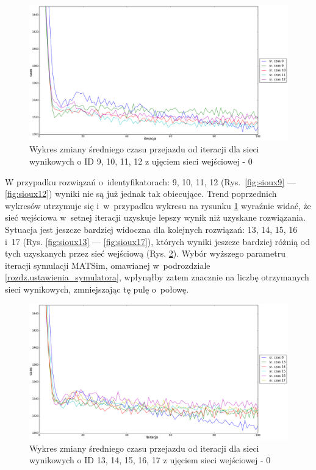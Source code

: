 \documentclass[twoside,12pt]{report}
\begin{document}
\begin{figure}[htbp]
\centering
\includegraphics[width=1\textwidth]{img/iters/iters3}
\caption{Wykres zmiany średniego czasu przejazdu od iteracji dla sieci wynikowych  o ID 9, 10, 11, 12 z ujęciem sieci wejściowej - 0}
\label{fig:iters3}
\end{figure}

W przypadku rozwiązań o~identyfikatorach: 9, 10, 11, 12 (Rys.~\ref{fig:sioux9} --- \ref{fig:sioux12}) wyniki nie są już jednak tak obiecujące. Trend poprzednich wykresów utrzymuje się i~w~przypadku wykresu na rysunku \ref{fig:iters3} wyraźnie widać, że sieć wejściowa w~setnej iteracji uzyskuje lepszy wynik niż uzyskane rozwiązania. Sytuacja jest jeszcze bardziej widoczna dla kolejnych rozwiązań: 13, 14, 15, 16 i~17 (Rys. \ref{fig:sioux13} --- \ref{fig:sioux17}), których wyniki jeszcze bardziej różnią od tych uzyskanych przez sieć wejściową (Rys. \ref{fig:iters4}). Wybór wyższego parametru iteracji symulacji MATSim, omawianej w~podrozdziale \ref{rozdz.ustawienia_symulatora}, wpłynąłby zatem znacznie  na liczbę otrzymanych sieci wynikowych, zmniejszając tę pulę o~połowę.

\begin{figure}[htbp]
\centering
\includegraphics[width=1\textwidth]{img/iters/iters4}
\caption{Wykres zmiany średniego czasu przejazdu od iteracji dla sieci wynikowych o ID 13, 14, 15, 16, 17 z ujęciem sieci wejściowej - 0}
\label{fig:iters4}
\end{figure}
\end{document}
